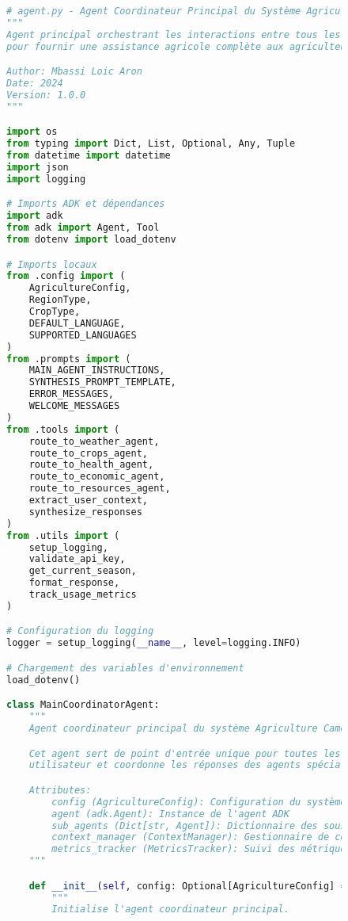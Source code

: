 \begin{figure}[H]
\centering
\begin{lstlisting}[language=Python, caption=Structure complète de l'agent principal]
# agent.py - Agent Coordinateur Principal du Système Agriculture Cameroun
"""
Agent principal orchestrant les interactions entre tous les agents spécialisés
pour fournir une assistance agricole complète aux agriculteurs camerounais.

Author: Mbassi Loic Aron
Date: 2024
Version: 1.0.0
"""

import os
from typing import Dict, List, Optional, Any, Tuple
from datetime import datetime
import json
import logging

# Imports ADK et dépendances
import adk
from adk import Agent, Tool
from dotenv import load_dotenv

# Imports locaux
from .config import (
    AgricultureConfig,
    RegionType,
    CropType,
    DEFAULT_LANGUAGE,
    SUPPORTED_LANGUAGES
)
from .prompts import (
    MAIN_AGENT_INSTRUCTIONS,
    SYNTHESIS_PROMPT_TEMPLATE,
    ERROR_MESSAGES,
    WELCOME_MESSAGES
)
from .tools import (
    route_to_weather_agent,
    route_to_crops_agent,
    route_to_health_agent,
    route_to_economic_agent,
    route_to_resources_agent,
    extract_user_context,
    synthesize_responses
)
from .utils import (
    setup_logging,
    validate_api_key,
    get_current_season,
    format_response,
    track_usage_metrics
)

# Configuration du logging
logger = setup_logging(__name__, level=logging.INFO)

# Chargement des variables d'environnement
load_dotenv()

class MainCoordinatorAgent:
    """
    Agent coordinateur principal du système Agriculture Cameroun.

    Cet agent sert de point d'entrée unique pour toutes les requêtes
    utilisateur et coordonne les réponses des agents spécialisés.

    Attributes:
        config (AgricultureConfig): Configuration du système
        agent (adk.Agent): Instance de l'agent ADK
        sub_agents (Dict[str, Agent]): Dictionnaire des sous-agents
        context_manager (ContextManager): Gestionnaire de contexte
        metrics_tracker (MetricsTracker): Suivi des métriques
    """

    def __init__(self, config: Optional[AgricultureConfig] = None):
        """
        Initialise l'agent coordinateur principal.


\end{lstlisting}
\end{figure}
